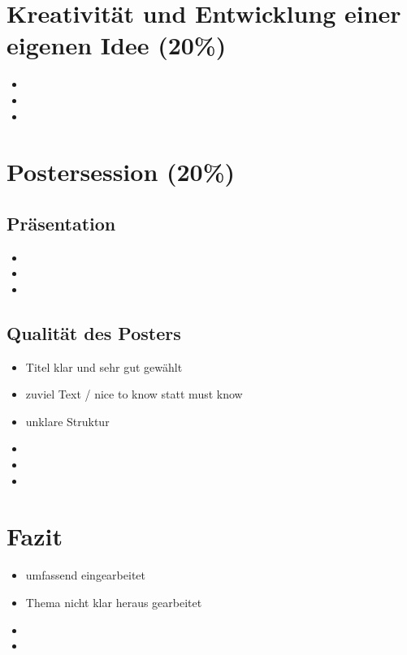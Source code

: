 \documentclass[german,headsepline]{scrartcl}
\begin{document}
\section{Kreativität und Entwicklung einer eigenen Idee (20\%)}
\begin{itemize}
  \item
  \item
  \item
\end{itemize}

\section{Postersession (20\%)}

\subsection{Präsentation}
\begin{itemize}
  \item 
  \item 
  \item
\end{itemize}

\subsection{Qualität des Posters}
\begin{itemize}
  \item Titel klar und sehr gut gewählt
  \item zuviel Text / nice to know statt must know
  \item unklare Struktur
  \item 
  \item
  \item
\end{itemize}

\section{Fazit}
\begin{itemize}
  \item umfassend eingearbeitet
  \item Thema nicht klar heraus gearbeitet
  \item
  \item
\end{itemize}
\end{document}
